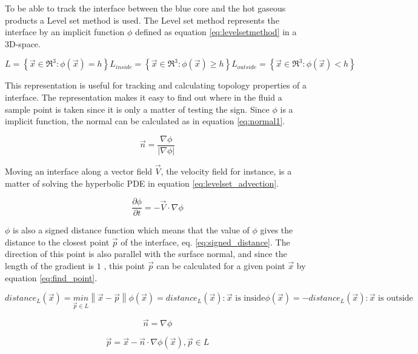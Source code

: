 To be able to track the interface between the blue core and the hot gaseous products a Level set method is used. The Level set method represents the interface by an implicit function $\phi$ defined as equation \ref{eq:levelsetmethod} in a 3D-space. 

\begin{subequations}
\label{eq:levelsetmethod}
\begin{equation}
 L = \left \{ \vec{x} \in \Re^3 : \phi(\vec{x}) = h  \right \}
\end{equation}    
\begin{equation}
  L_{inside} = \left \{ \vec{x} \in \Re^3 : \phi(\vec{x}) \geq h  \right \}
\end{equation}
\begin{equation}
  L_{outside} = \left \{ \vec{x} \in \Re^3 : \phi(\vec{x}) <  h  \right \}
\end{equation}
\end{subequations}

This representation is useful for tracking and calculating topology properties of a interface. The representation makes it easy to find out where in the fluid a sample point is taken since it is only a matter of testing the sign. Since $\phi$ is a implicit function, the normal can be calculated as in equation \ref{eq:normal1}.

\begin{equation}
\label{eq:normal1}
 \vec{n} = \frac{ \nabla \phi }{ \left | \nabla \phi \right | }
\end{equation}    

Moving an interface along a vector field $\vec{V}$, the velocity field for instance, is a matter of solving the hyperbolic PDE in equation \ref{eq:levelset_advection}.

 \begin{equation}
\label{eq:levelset_advection}
  \frac{\partial \phi}{\partial t} = -\vec{V} \cdot \nabla \phi
\end{equation}  

$\phi$ is also a signed distance function which means that the value of $\phi$ gives the distance to the closest point $\vec{p}$ of the interface, eq. \ref{eq:signed_distance}. The direction of this point is also parallel with the surface normal, and since the length of the gradient is $1$ \cite{bridson}, this point $\vec{p}$ can be calculated for a given point $\vec{x}$ by equation \ref{eq:find_point}.

\begin{subequations}
\label{eq:signed_distance}
\begin{equation}
distance_L(\vec{x}) = \underset{\vec{p} \in L}{min} \left \| \vec{x} - \vec{p} \right \|
\end{equation}    
\begin{equation}
\phi(\vec{x}) = distance_L(\vec{x}) : \vec{x} \text{ is inside}
\end{equation}
\begin{equation}
\phi(\vec{x}) = -distance_L(\vec{x}) : \vec{x} \text{ is outside}
\end{equation}
\end{subequations}

\begin{equation}
\label{eq:normal2}
 \vec{n} = \nabla \phi
\end{equation} 

\begin{equation}
\label{eq:find_point}
 \vec{p} = \vec{x} - \vec{n} \cdot \nabla\phi(\vec{x}), \vec{p} \in L
\end{equation}  